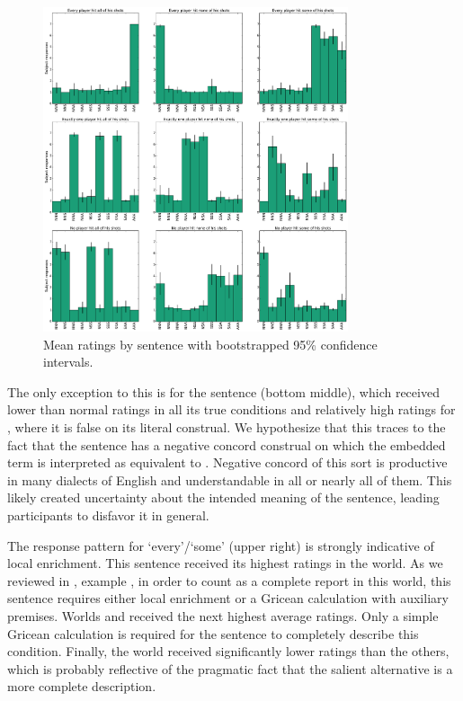 \documentclass[leqno]{article}
\begin{document}
\begin{figure}[tp]
  \centering
  \includegraphics[width=0.8\textwidth]{fig/basketball-pilot-2-11-14-results-parsed}
  \caption{Mean ratings by sentence with bootstrapped 95\% confidence intervals.}
  \label{fig:exp1-results}
\end{figure}

The only exception to this is for the sentence  (bottom middle), which received lower than normal
ratings in all its true conditions and relatively high ratings for
, where it is false on its literal construal. We
hypothesize that this traces to the fact that the sentence has a
negative concord construal on which the embedded term is interpreted
as equivalent to . Negative concord of this
sort is productive in many dialects of English and understandable in
all or nearly all of them. This likely created uncertainty about the
intended meaning of the sentence, leading participants to disfavor it
in general.

The response pattern for `every'/`some' (upper right) is strongly
indicative of local enrichment. This sentence received its highest
ratings in the  world. As we reviewed in
, example , in order to
count as a complete report in this world, this sentence requires
either local enrichment or a Gricean calculation with auxiliary
premises. Worlds  and  received the next highest
average ratings. Only a simple Gricean calculation is required for the
sentence to completely describe this condition. Finally, the
 world received significantly lower ratings than the
others, which is probably reflective of the pragmatic fact that the
salient alternative  is a more
complete description.
\end{document}
